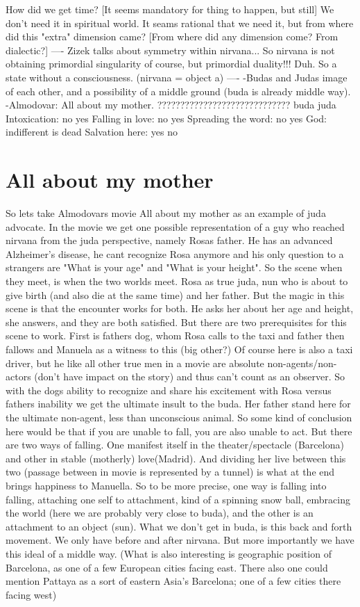 \documentclass[10pt]{book}
\begin{document}
How did we get time? [It seems mandatory for thing to happen, but still] We don't need it in spiritual world. It seams rational that we need it, but from where did this "extra" dimension came? [From where did any dimension come? From dialectic?] 
----
Zizek talks about symmetry within nirvana... So nirvana is not obtaining primordial singularity of course, but primordial duality!!! Duh. So a state without a consciousness. (nirvana = object a)
----
-Budas and Judas image of each other, and a possibility of a middle ground (buda is already middle way).
-Almodovar: All about my mother.
?????????????????????????????
					buda		juda
Intoxication:		no			yes
Falling in love:	no			yes
Spreading the word: no			yes
God:				indifferent	is dead
Salvation here:		yes			no

\section{All about my mother}
So lets take Almodovars movie All about my mother as an example of juda advocate. In the movie we get one possible representation of a guy who reached nirvana from the juda perspective, namely Rosas father. He has an advanced Alzheimer's disease, he cant recognize Rosa anymore and his only question to a strangers are "What is your age" and "What is your height". So the scene when they meet, is when the two worlds meet. Rosa as true juda, nun who is about to give birth (and also die at the same time) and her father. But the magic in this scene is that the encounter works for both. He asks her about her age and height, she answers, and they are both satisfied. But there are two prerequisites for this scene to work. First is fathers dog, whom Rosa calls to the taxi and father then fallows and Manuela as a witness to this (big other?) Of course here is also a taxi driver, but he like all other true men in a movie are absolute non-agents/non-actors (don't have impact on the story) and thus can't count as an observer. So with the dogs ability to recognize and share his excitement with Rosa versus fathers inability we get the ultimate insult to the buda. Her father stand here for the ultimate non-agent, less than unconscious animal. 
So some kind of conclusion here would be that if you are unable to fall, you are also unable to act. But there are two ways of falling. One manifest itself in the theater/spectacle (Barcelona) and other in stable (motherly) love(Madrid). And dividing her live between this two (passage between in movie is represented by a tunnel) is what at the end brings happiness to Manuella. So to be more precise, one way is falling into falling, attaching one self to attachment, kind of a spinning snow ball, embracing the world (here we are probably very close to buda), and the other is an attachment to an object (sun). What we don't get in buda, is this back and forth movement. We only have before and after nirvana. But more importantly we have this ideal of a middle way. (What is also interesting is geographic position of Barcelona, as one of a few European cities facing east. There also one could mention Pattaya as a sort of eastern Asia's Barcelona; one of a few cities there facing west)
\end{document}
